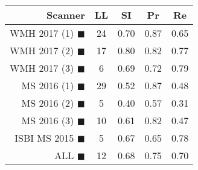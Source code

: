 \begin{tabular}{rcccc}
\toprule
Scanner & LL & SI & Pr & Re \\
\midrule
WMH 2017 (1) {\color[rgb]{ 1.00 0.00 0.00}$\blacksquare$} & 24 & 0.70 & 0.87 & 0.65 \\
WMH 2017 (2) {\color[rgb]{ 1.00 0.50 0.00}$\blacksquare$} & 17 & 0.80 & 0.82 & 0.77 \\
WMH 2017 (3) {\color[rgb]{ 1.00 0.80 0.00}$\blacksquare$} & 6 & 0.69 & 0.72 & 0.79 \\
MS  2016 (1) {\color[rgb]{ 0.20 0.80 0.00}$\blacksquare$} & 29 & 0.52 & 0.87 & 0.48 \\
MS  2016 (2) {\color[rgb]{ 0.00 0.40 1.00}$\blacksquare$} & 5 & 0.40 & 0.57 & 0.31 \\
MS  2016 (3) {\color[rgb]{ 0.60 0.00 1.00}$\blacksquare$} & 10 & 0.61 & 0.82 & 0.47 \\
ISBI MS 2015 {\color[rgb]{ 1.00 0.00 1.00}$\blacksquare$} & 5 & 0.67 & 0.65 & 0.78 \\
\midrule
ALL {\color[rgb]{ 1.00 1.00 1.00}$\blacksquare$} & 12 & 0.68 & 0.75 & 0.70 \\
\bottomrule
\end{tabular}